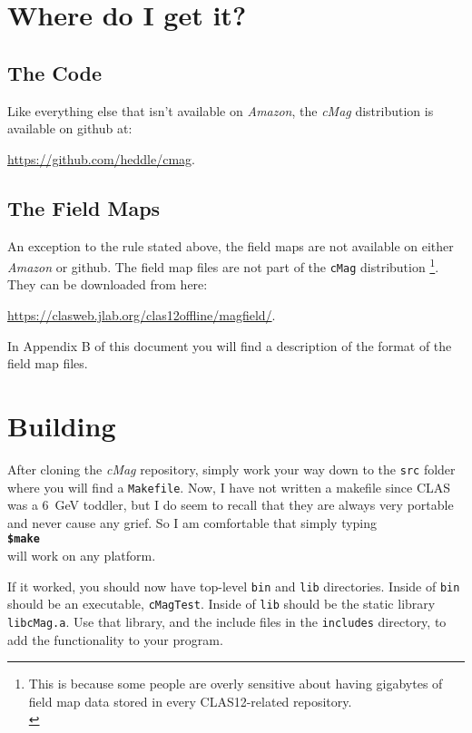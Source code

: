 \documentclass{article}
\begin{document}
\section {Where do I get it?}
\subsection {The Code}
Like everything else that isn't available on \textit{Amazon}, the \textit{cMag} distribution is available on github at:

\url{https://github.com/heddle/cmag}.

\subsection {The Field Maps}
An exception to the rule stated above, the field maps are not available on either \textit{Amazon} or github. The field map files are not part of the \texttt{cMag} distribution \footnote{This is because some people are overly sensitive about having gigabytes of field map data stored in every CLAS12-related repository.\\}. They can be downloaded from here:\

 \url{https://clasweb.jlab.org/clas12offline/magfield/}.

In Appendix B of this document you will find a description of the format of the field map files.


\section {Building}
After cloning the \textit{cMag} repository, simply work your way down to the \texttt{src} folder where you will find a \texttt{Makefile}. Now, I have not written a makefile since CLAS was a 6\ GeV toddler, but I do seem to recall that they are always very portable and never cause any grief. So I am comfortable that simply typing\\

\textbf{\texttt{\$make}}\\

will work on any platform. 

If it worked, you should now have top-level \texttt{bin} and \texttt{lib} directories. Inside of \texttt{bin} should be an executable, \texttt{cMagTest}. Inside of \texttt{lib} should be the static library \texttt {libcMag.a}. Use that library, and the include files in the \texttt{includes} directory, to add the  functionality to your program.
\end{document}
